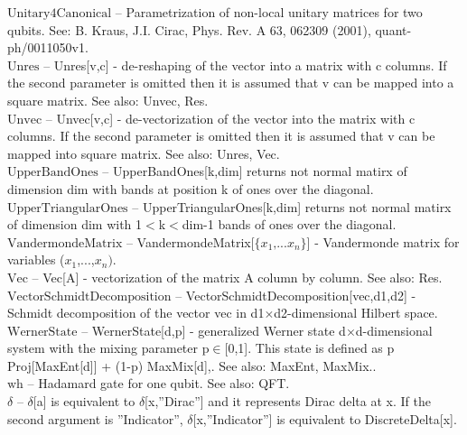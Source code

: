 \documentclass[a4paper,10pt]{scrartcl}
\begin{document}
\textbf{$ \text{Unitary4Canonical} $ }-- Parametrization of non-local unitary matrices for two qubits. See: B. Kraus, J.I. Cirac, Phys. Rev. A 63, 062309 (2001), quant-ph/0011050v1.$  $\\

\textbf{$ \text{Unres} $ }-- Unres[v,c] - de-reshaping of the vector into a matrix with c columns. If the second parameter is omitted then it is assumed that v can be mapped into a square matrix. See also: Unvec, Res.$  $\\

\textbf{$ \text{Unvec} $ }-- Unvec[v,c] - de-vectorization of the vector into the matrix with c columns. If the second parameter is omitted then it is assumed that v can be mapped into square matrix. See also: Unres, Vec.$  $\\

\textbf{$ \text{UpperBandOnes} $ }-- UpperBandOnes[k,dim] returns not normal matirx of dimension dim with bands at position k of ones over the diagonal.$  $\\

\textbf{$ \text{UpperTriangularOnes} $ }-- UpperTriangularOnes[k,dim] returns not normal matirx of dimension dim with 1$<$k$<$dim-1 bands of ones over the diagonal.$  $\\

\textbf{$ \text{VandermondeMatrix} $ }-- VandermondeMatrix[$\{$$ x_1\text{,...}x_n $$\}$] - Vandermonde matrix for variables ($ x_1 $,...,$ x_n\text{).} $\\

\textbf{$ \text{Vec} $ }-- Vec[A] - vectorization of the matrix A column by column. See also: Res.$  $\\

\textbf{$ \text{VectorSchmidtDecomposition} $ }-- VectorSchmidtDecomposition[vec,d1,d2] - Schmidt decomposition of the vector vec in d1$\times $d2-dimensional Hilbert space.$  $\\

\textbf{$ \text{WernerState} $ }-- WernerState[d,p] - generalized Werner state d$\times $d-dimensional system with the mixing parameter p$\in $[0,1]. This state is defined as p Proj[MaxEnt[d]] + (1-p) MaxMix[d],. See also: MaxEnt, MaxMix..$  $\\

\textbf{$ \text{wh} $ }-- Hadamard gate for one qubit. See also: QFT.$  $\\

\textbf{$ \delta  $ }-- $\delta $[a] is equivalent to $\delta $[x,''Dirac''] and it represents Dirac delta at x. If the second argument is ''Indicator'', $\delta $[x,''Indicator''] is equivalent to DiscreteDelta[x].$  $\\
\end{document}
